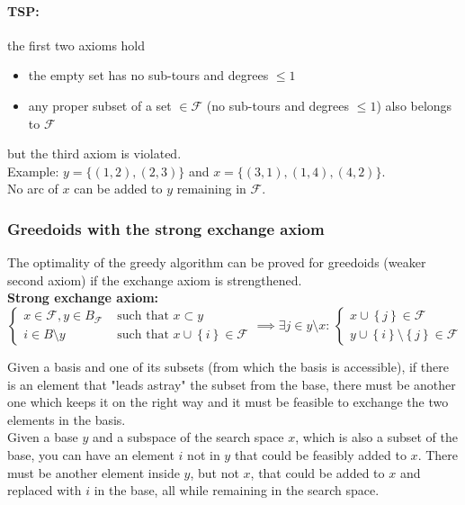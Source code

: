 \vfill

\paragraph{TSP:} the first two axioms hold
\begin{itemize}
	\item the empty set has no sub-tours and degrees $\leq 1$
	\item any proper subset of a set $\in \mathcal{F}$ (no sub-tours and degrees $\leq 1$) also belongs to $\mathcal{F}$
\end{itemize}
but the third axiom is violated.\\
Example: $y = \{(1, 2), (2, 3)\}$ and $x = \{(3, 1), (1, 4), (4, 2)\}$.\\
No arc of $x$ can be added to $y$ remaining in $\mathcal{F}$.\\

\newpage

\subsubsection{Greedoids with the strong exchange axiom}
The optimality of the greedy algorithm can be proved for greedoids (weaker second axiom) if the exchange axiom is strengthened.\\

\textbf{Strong exchange axiom:}
$$ 
\begin{cases}
	x \in \mathcal{F}, y \in B_{\mathcal{F}} & \text{ such that } x \subset y \\
	i \in B \setminus y & \text{ such that } x \cup \left\{i\right\} \in \mathcal{F}
\end{cases}
\implies \exists j \in y \setminus x: \, 
\begin{cases}
	x \cup \left\{j\right\} \in \mathcal{F} \\
	y \cup \left\{i\right\} \setminus \left\{j\right\} \in \mathcal{F}
\end{cases}
$$

Given a basis and one of its subsets (from which the basis is accessible), if there is an element that "leads astray" the subset from the base, there must be another one which keeps it on the right way and it must be feasible to exchange the two elements in the basis.\\

Given a base $y$ and a subspace of the search space $x$, which is also a subset of the base, you can have an element $i$ not in $y$ that could be feasibly added to $x$. There must be another element inside $y$, but not $x$, that could be added to $x$ and replaced with $i$ in the base, all while remaining in the search space.\\

